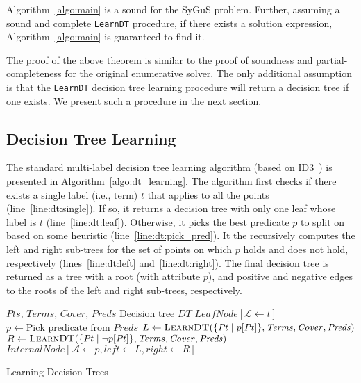 \documentclass{llncs}
\newcommand\Points{\mathit{Pts}}
\newcommand\Point{\mathit{Pt}}
\newcommand\Predicates{\mathit{Preds}}
\newcommand\Pred{p}
\newcommand\Terms{\mathit{Terms}}
\newcommand\Term{t}
\newcommand\Cover{\mathit{Cover}}
\newcommand\DecisionTree{\mathit{DT}}
\newcommand\Attribute{\mathcal{A}}
\newcommand\Label{\mathcal{L}}
\newcommand{\sygus}{{\sffamily\fontsize{8.5}{10}\selectfont
    SyGuS}\xspace}
\begin{document}
\begin{theorem}
  Algorithm~\ref{algo:main} is a sound for the \sygus problem.
  Further, assuming a sound and complete {\tt LearnDT} procedure, if
  there exists a solution expression, Algorithm~\ref{algo:main} is
  guaranteed to find it.
\end{theorem}
The proof of the above theorem is similar to the proof of soundness and
partial-completeness for the original enumerative solver.
The only additional assumption is that the {\tt LearnDT} decision tree
learning procedure will return a decision tree if one exists.
We present such a procedure in the next section.


\subsection{Decision Tree Learning}
\label{sec:decision_trees}

The standard multi-label decision tree learning algorithm (based on
ID3~\cite{quinlan-86}) is presented in Algorithm~\ref{algo:dt_learning}.
The algorithm first checks if there exists a single label (i.e., term)
$\Term$ that applies to all the points (line~\ref{line:dt:single}).
If so, it returns a decision tree with only one leaf whose label is
$\Term$ (line~\ref{line:dt:leaf}).
Otherwise, it picks the best predicate $\Pred$ to split on based on some
heuristic (line~\ref{line:dt:pick_pred}).
It the recursively computes the left and right sub-trees for the set of
points on which $\Pred$ holds and does not hold, respectively
(lines~\ref{line:dt:left} and~\ref{line:dt:right}).
The final decision tree is returned as a tree with a root (with
attribute $\Pred$), and positive and negative edges to the roots of the
left and right sub-trees, respectively.

\begin{algorithm}
  \begin{algorithmic}[1]
    \Require $\Points$, $\Terms$, $\Cover$, $\Predicates$
    \Ensure Decision tree $\DecisionTree$
    \If { $\exists \Term : \Points \subseteq \Cover[\Term]$ }\label{line:dt:single}
    \Return $\mathit{LeafNode}[\Label \gets \Term]$ \label{line:dt:leaf}
    \EndIf
    \State $\Pred \gets \mbox{Pick predicate from $\Predicates$}$\label{line:dt:pick_pred}
    \State $L \gets \Call{LearnDT}{\{ \Point \mid \Pred[\Point] \},
      \Terms, \Cover, \Predicates }$\label{line:dt:left}
    \State $R \gets \Call{LearnDT}{\{ \Point \mid \neg \Pred[\Point]
      \}, \Terms, \Cover, \Predicates }$\label{line:dt:right}
    \State \Return $\mathit{InternalNode}[\Attribute \gets \Pred,  \mathit{left} \gets L , \mathit{right} \gets R ]$
  \end{algorithmic}
  \caption{Learning Decision Trees}
  \label{algo:dt_learning}
\end{algorithm}
\end{document}
